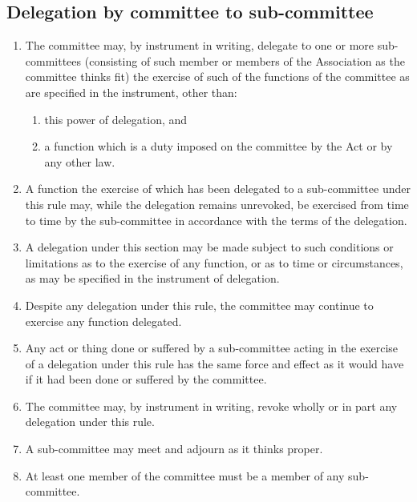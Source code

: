 \documentclass{article}
\begin{document}
\subsection{Delegation by committee to sub-committee}
\begin{enumerate}
  \item The committee may, by instrument in writing, delegate to one or more sub-committees (consisting of such member or members of the Association as the committee thinks fit) the exercise of such of the functions of the committee as are specified in the instrument, other than:
    \begin{enumerate}
      \item this power of delegation, and
      \item a function which is a duty imposed on the committee by the Act or by any other law.
    \end{enumerate}
  \item A function the exercise of which has been delegated to a sub-committee under this rule may, while the delegation remains unrevoked, be exercised from time to time by the sub-committee in accordance with the terms of the delegation.
  \item A delegation under this section may be made subject to such conditions or limitations as to the exercise of any function, or as to time or circumstances, as may be specified in the instrument of delegation.
  \item Despite any delegation under this rule, the committee may continue to exercise any function delegated.
  \item Any act or thing done or suffered by a sub-committee acting in the exercise of a delegation under this rule has the same force and effect as it would have if it had been done or suffered by the committee.
  \item The committee may, by instrument in writing, revoke wholly or in part any delegation under this rule.
  \item A sub-committee may meet and adjourn as it thinks proper.
  \item At least one member of the committee must be a member of any sub-committee.
\end{enumerate}
\end{document}
